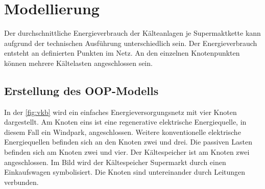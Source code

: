 \chapter{Modellierung}
\label{chap:SEVN}
\minitoc

Der durchschnittliche Energieverbrauch der Kälteanlagen je Supermaktkette
kann aufgrund der technischen Ausführung unterschiedlich sein. Der
Energieverbrauch entsteht an definierten Punkten im Netz. An den einzelnen
Knotenpunkten können mehrere Kältelasten angeschlossen sein.


\section{Erstellung des OOP-Modells}

In der \cref{fig:vkb} wird ein einfaches Energieversorgungsnetz mit vier Knoten
dargestellt. Am Knoten eins ist eine regenerative elektrische Energiequelle, in
diesem Fall ein Windpark, angeschlossen. Weitere konventionelle elektrische
Energiequellen befinden sich an den Knoten zwei und drei. Die passiven Lasten
befinden sich am Knoten zwei und vier. Der Kältespeicher ist am Knoten zwei
angeschlossen. Im Bild wird der Kältespeicher Supermarkt durch einen
Einkaufswagen symbolisiert. Die Knoten sind untereinander durch Leitungen
verbunden.

